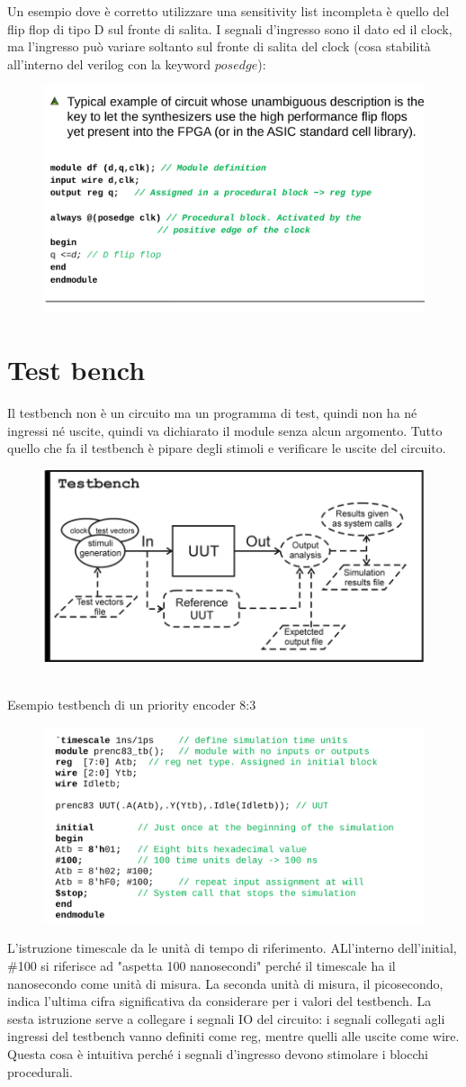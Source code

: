 \documentclass{book}
\begin{document}
        Un esempio dove è corretto utilizzare una sensitivity list incompleta è quello del flip flop di tipo D sul fronte di salita. I segnali d'ingresso sono il dato ed il clock, ma l'ingresso può variare soltanto sul fronte di salita del clock (cosa stabilità all'interno del verilog con la keyword $posedge$):
        \begin{figure}[h!]
            \centering
            \includegraphics[width=0.5\linewidth]{img/chapt7img7.png}
        \end{figure}

    \section{Test bench}
        Il testbench non è un circuito ma un programma di test, quindi non ha né ingressi né uscite, quindi va dichiarato il module senza alcun argomento. Tutto quello che fa il testbench è pipare degli stimoli e verificare le uscite del circuito.
        \begin{figure}[h!]
            \centering
            \includegraphics[width=0.5\linewidth]{img/chapt7img8.png}
        \end{figure}\\ Esempio testbench di un priority encoder 8:3
        \begin{figure}[h!]
            \centering
            \includegraphics[width=0.5\linewidth]{img/chapt7img9.png}
        \end{figure}
        L'istruzione timescale da le unità di tempo di riferimento. ALl'interno dell'initial, \#100 si riferisce ad "aspetta 100 nanosecondi" perché il timescale ha il nanosecondo come unità di misura. La seconda unità di misura, il picosecondo, indica l'ultima cifra significativa da considerare per i valori del testbench. La sesta istruzione serve a collegare i segnali IO del circuito: i segnali collegati agli ingressi del testbench vanno definiti come reg, mentre quelli alle uscite come wire. Questa cosa è intuitiva perché i segnali d'ingresso devono stimolare i blocchi procedurali.
\end{document}
